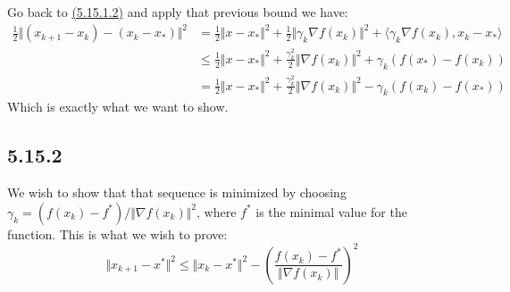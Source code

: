 \documentclass[]{article}
\begin{document}
        Go back to \hyperref[eqn:5.15.1.2]{(5.15.1.2)} and apply that previous bound we have: 
        \begin{align*}\tag{5.15.1.6}\label{eqn:5.15.1.6}
            \frac{1}{2}\Vert (x_{k + 1} - x_k) - (x_k - x_*)\Vert^2 &= 
            \frac{1}{2}\Vert x - x_*\Vert^2 + \frac{1}{2}\Vert \gamma_k \nabla f(x_k)\Vert^2 
            + \langle \gamma_k \nabla f(x_k), x_k - x_*\rangle
            \\
            &\le 
            \frac{1}{2}\Vert x - x_*\Vert^2+ 
            \frac{\gamma_k^2}{2} \Vert \nabla f(x_k)\Vert^2 + 
            \gamma_k (f(x_*) - f(x_k))
            \\
            &= 
            \frac{1}{2}\Vert x - x_*\Vert^2+ 
            \frac{\gamma_k^2}{2} \Vert \nabla f(x_k)\Vert^2 -
            \gamma_k (f(x_k) - f(x_*))
        \end{align*}
        Which is exactly what we want to show. 
    \subsection*{5.15.2}
        We wish to show that that sequence is minimized by choosing $\gamma_k = (f(x_k) - f^*)/ \Vert \nabla f(x_k)\Vert^2$, where $f^*$ is the minimal value for the function. This is what we wish to prove: 
        $$
            \Vert x_{k + 1} - x^*\Vert^2 \le 
            \Vert x_k - x^*\Vert^2 - 
            \left(
                \frac{f(x_k) - f^*}{\Vert \nabla f(x_k)\Vert}
            \right)^2
        $$
        
\end{document}

